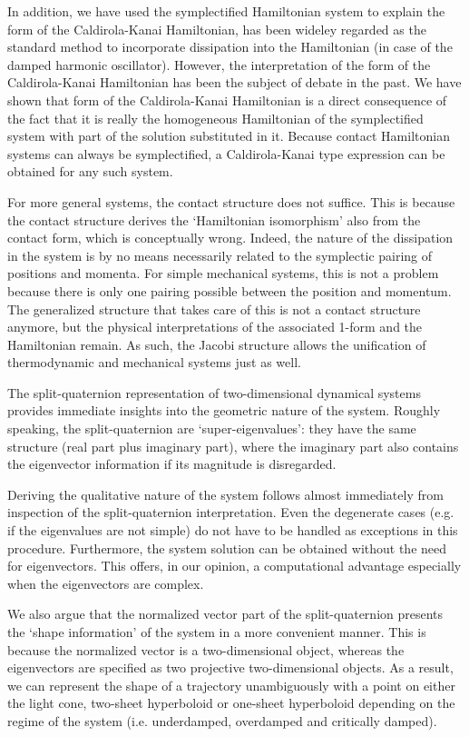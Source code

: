 In addition, we have used the symplectified Hamiltonian system to explain the form of the Caldirola-Kanai Hamiltonian, has been wideley regarded as the standard method to incorporate dissipation into the Hamiltonian (in case of the damped harmonic oscillator). However, the interpretation of the form of the Caldirola-Kanai Hamiltonian has been the subject of debate in the past. We have shown that form of the Caldirola-Kanai Hamiltonian is a direct consequence of the fact that it is really the homogeneous Hamiltonian of the symplectified system with part of the solution substituted in it.
Because contact Hamiltonian systems can always be symplectified, a Caldirola-Kanai type expression can be obtained for any such system.

For more general systems, the contact structure does not suffice. This is because the contact structure derives the `Hamiltonian isomorphism' also from the contact form, which is conceptually wrong. Indeed, the nature of the dissipation in the system is by no means necessarily related to the symplectic pairing of positions and momenta. For simple mechanical systems, this is not a problem because there is only one pairing possible between the position and momentum. The generalized structure that takes care of this is not a contact structure anymore, but the physical interpretations of the associated 1-form and the Hamiltonian remain. As such, the Jacobi structure allows the unification of thermodynamic and mechanical systems just as well.

The split-quaternion representation of two-dimensional dynamical systems provides immediate insights into the geometric nature of the system. Roughly speaking, the split-quaternion are `super-eigenvalues': they have the same structure (real part plus imaginary part), where the imaginary part also contains the eigenvector information if its magnitude is disregarded.

Deriving the qualitative nature of the system follows almost immediately from inspection of the split-quaternion interpretation. Even the degenerate cases (e.g. if the eigenvalues are not simple) do not have to be handled as exceptions in this procedure. 
Furthermore, the system solution can be obtained without the need for eigenvectors. This offers, in our opinion, a computational advantage especially when the eigenvectors are complex.

We also argue that the normalized vector part of the split-quaternion presents the `shape information' of the system in a more convenient manner. This is because the normalized vector is a two-dimensional object, whereas the eigenvectors are specified as two projective two-dimensional objects. As a result, we can represent the shape of a trajectory unambiguously with a point on either the light cone, two-sheet hyperboloid or one-sheet hyperboloid depending on the regime of the system (i.e. underdamped, overdamped and critically damped).

